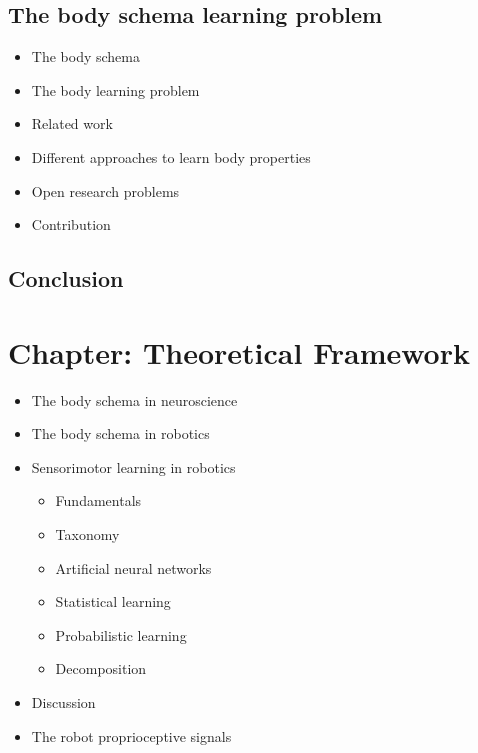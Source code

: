 \documentclass[12pt, a4paper]{article}
\begin{document}
\subsection*{The body schema learning problem}
\begin{itemize}
	\item The body schema
	\item The body learning problem
	\item Related work
	\item Different approaches to learn body properties
	\item Open research problems
	\item Contribution
\end{itemize}

\subsection*{Conclusion}

\section*{Chapter: Theoretical Framework}

\begin{itemize}
	\item The body schema in neuroscience
	\item The body schema in robotics
	\item Sensorimotor learning in robotics
	\begin{itemize}
		\item Fundamentals
		\item Taxonomy
		\item[] Artificial neural networks
		\item Statistical learning
		\item[] Probabilistic learning
		\item Decomposition
	\end{itemize}
	\item Discussion
	\item The robot proprioceptive signals
\end{itemize}
\end{document}
